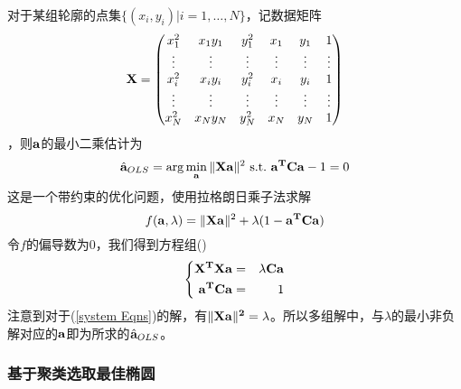 对于某组轮廓的点集$\{(x_i, y_i)|i=1,\dots, N \}$，记数据矩阵
\begin{equation}
    \bf X = \begin{pmatrix}
        x_1^2 & x_1y_1 & y_1^2 & x_1 & y_1 & 1 \\
        \vdots & \vdots & \vdots & \vdots & \vdots & \vdots \\
        x_i^2 & x_iy_i & y_i^2 & x_i & y_i & 1 \\
        \vdots & \vdots & \vdots & \vdots & \vdots & \vdots \\
        x_N^2 & x_Ny_N & y_N^2 & x_N & y_N & 1 \\
    \end{pmatrix} 
\end{equation}
，则$\bf a$的最小二乘估计为
\begin{equation}
    \hat {\bf a}_{OLS} = \arg \min_{\bf a} \|{\bf X a }\|^2 \ \text{s.t.} \ {\bf a^T C a} - 1 = 0
\end{equation}
这是一个带约束的优化问题，使用拉格朗日乘子法求解
\begin{equation}
    f({\bf a}, \lambda) = \|{\bf Xa}\|^2 + \lambda (1 - {\bf a^T C a}) 
\end{equation}
令$f$的偏导数为0，我们得到方程组(\label{system Eqns})
\begin{equation}
    \left\{
    \begin{aligned}
        {\bf X^T X a} &=& \lambda {\bf Ca} \\
        {\bf a^T C a} &=& 1  
    \end{aligned}
    \right.
    \label{system Eqns} 
\end{equation}
注意到对于(\ref{system Eqns})的解，有$\|\bf{X a}\|^2 = \lambda$。所以多组解中，与$\lambda$的最小非负解对应的$\bf a$即为所求的$\hat {\bf a}_{OLS}$。

\subsubsection{基于聚类选取最佳椭圆}




